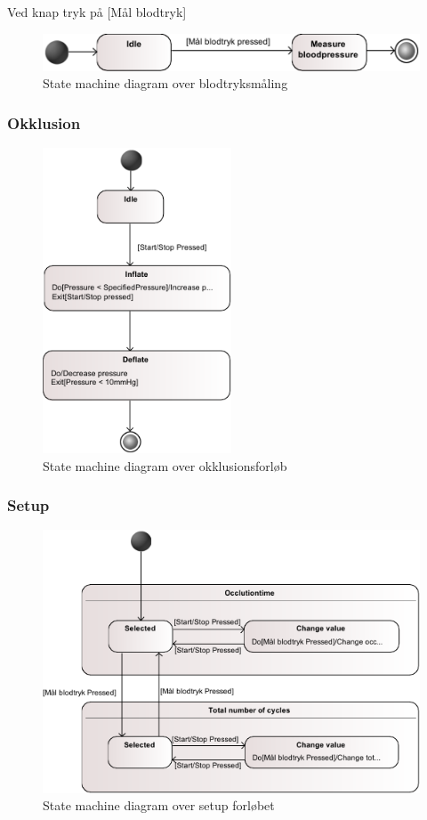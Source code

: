 Ved knap tryk på [Mål blodtryk] \\
\begin{figure}[H]
\includegraphics[width=\textwidth]{pdfs/STM_Konditionering2-crop.pdf}
\caption{State machine diagram over blodtryksmåling}
\end{figure}
\newpage

\subsubsection{Okklusion}

	\begin{figure}[H]
		\begin{center}
		\includegraphics[width=0.5\textwidth]{pdfs/STM_Okklusion-crop.pdf}
		\caption{State machine diagram over okklusionsforløb}
	\end{center}
	\end{figure}

\newpage

\subsubsection{Setup}
\begin{figure}[H]
	\includegraphics[width=\textwidth]{pdfs/STM_Setup-crop.pdf}
	\caption{State machine diagram over setup forløbet}
\end{figure}

